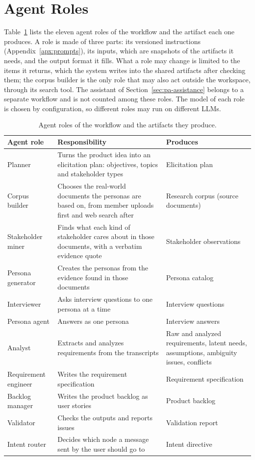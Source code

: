 \section{Agent Roles}
\label{sec:pa-agent-roles}

Table~\ref{tab:pa-agent-roles} lists the eleven agent roles of the workflow and the artifact each one produces. A role is made of three parts: its versioned instructions (Appendix~\ref{apx:prompts}), its inputs, which are snapshots of the artifacts it needs, and the output format it fills. What a role may change is limited to the items it returns, which the system writes into the shared artifacts after checking them; the corpus builder is the only role that may also act outside the workspace, through its search tool. The assistant of Section~\ref{sec:pa-assistance} belongs to a separate workflow and is not counted among these roles. The model of each role is chosen by configuration, so different roles may run on different LLMs.

\begin{table}[H]
    \centering
    \caption{Agent roles of the workflow and the artifacts they produce.}
    \label{tab:pa-agent-roles}
    \begin{tabularx}{\linewidth}{|l|X|X|}
        \hline
        \textbf{Agent role} & \textbf{Responsibility} & \textbf{Produces} \\
        \hline
        Planner & Turns the product idea into an elicitation plan: objectives, topics and stakeholder types & Elicitation plan \\
        Corpus builder & Chooses the real-world documents the personas are based on, from member uploads first and web search after & Research corpus (source documents) \\
        Stakeholder miner & Finds what each kind of stakeholder cares about in those documents, with a verbatim evidence quote & Stakeholder observations \\
        Persona generator & Creates the personas from the evidence found in those documents & Persona catalog \\
        Interviewer & Asks interview questions to one persona at a time & Interview questions \\
        Persona agent & Answers as one persona & Interview answers \\
        Analyst & Extracts and analyzes requirements from the transcripts & Raw and analyzed requirements, latent needs, assumptions, ambiguity issues, conflicts \\
        Requirement engineer & Writes the requirement specification & Requirement specification \\
        Backlog manager & Writes the product backlog as user stories & Product backlog \\
        Validator & Checks the outputs and reports issues & Validation report \\
        Intent router & Decides which node a message sent by the user should go to & Intent directive \\
        \hline
    \end{tabularx}
\end{table}

